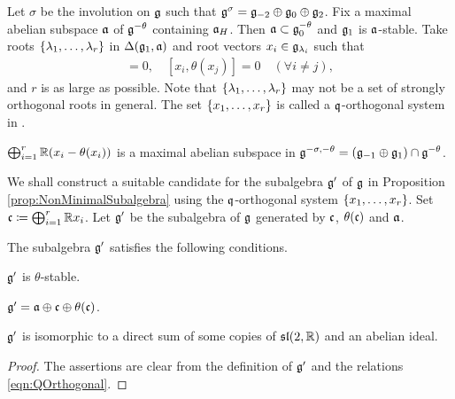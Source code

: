 Let $\sigma$ be the involution on $\mathfrak{g}$ such that $\mathfrak{g}^\sigma = \mathfrak{g}_{-2} \oplus \mathfrak{g}_0 \oplus \mathfrak{g}_2$.
Fix a maximal abelian subspace $\mathfrak{a}$ of $\mathfrak{g}^{-\theta}$ containing $\mathfrak{a}_H$.
Then $\mathfrak{a} \subset \mathfrak{g}^{-\theta}_0$ and $\mathfrak{g}_1$ is $\mathfrak{a}$-stable.
Take roots $\left\{\lambda_1, \ldots, \lambda_r \right\}$ in $\Delta(\mathfrak{g}_1, \mathfrak{a})$
and root vectors $x_i \in \mathfrak{g}_{\lambda_i}$ such that
\begin{align}
	[x_i, x_j] = 0, \quad [x_i, \theta(x_j)] = 0 \quad (\forall i \neq j), \label{eqn:QOrthogonal}
\end{align}
and $r$ is as large as possible.
Note that $\left\{\lambda_1, \ldots, \lambda_r \right\}$ may not be a set of strongly orthogonal roots in general.
The set $\left\{x_1, \ldots, x_r \right\}$ is called a $\mathfrak{q}$-orthogonal system in \cite{Ma79_orbits}.

\begin{fact} \label{fact:Matsuki}
	$\bigoplus_{i=1}^r \mathbb{R} (x_i - \theta(x_i))$ is a maximal abelian subspace in $\mathfrak{g}^{-\sigma, -\theta} = (\mathfrak{g}_{-1}\oplus \mathfrak{g}_1) \cap \mathfrak{g}^{-\theta}$.
\end{fact}

We shall construct a suitable candidate for the subalgebra $\mathfrak{g}'$ of $\mathfrak{g}$ in Proposition \ref{prop:NonMinimalSubalgebra} using the $\mathfrak{q}$-orthogonal system $\left\{x_1, \ldots, x_r \right\}$.
Set $\mathfrak{c} \coloneq \bigoplus_{i=1}^r \mathbb{R} x_i$.
Let $\mathfrak{g'}$ be the subalgebra of $\mathfrak{g}$ generated by $\mathfrak{c}$, $\theta(\mathfrak{c})$ and $\mathfrak{a}$.

\begin{lemma} \label{lem:ReductionStronglyOrthogonalBasic}
	The subalgebra $\mathfrak{g'}$ satisfies the following conditions.
	\begin{enumparen}
		\item $\mathfrak{g'}$ is $\theta$-stable.
		\item $\mathfrak{g'} = \mathfrak{a} \oplus \mathfrak{c} \oplus \theta(\mathfrak{c})$.
		\item $\mathfrak{g'}$ is isomorphic to a direct sum of some copies of $\mathfrak{sl}(2,\mathbb{R})$ and an abelian ideal.
	\end{enumparen}
\end{lemma}

\begin{proof}
	The assertions are clear from the definition of $\mathfrak{g}'$ and the relations \eqref{eqn:QOrthogonal}.
\end{proof}

